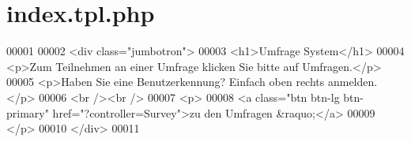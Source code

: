 \hypertarget{index_8tpl_8php}{\section{index.\-tpl.\-php}
\label{index_8tpl_8php}
}

\begin{DoxyCode}
00001 
00002       <div \textcolor{keyword}{class}=\textcolor{stringliteral}{"jumbotron"}>
00003         <h1>Umfrage System</h1>
00004         <p>Zum Teilnehmen an einer Umfrage klicken Sie bitte auf Umfragen.</p>
00005         <p>Haben Sie eine Benutzerkennung? Einfach oben rechts anmelden.</p>
00006         <br /><br />
00007         <p>
00008           <a \textcolor{keyword}{class}=\textcolor{stringliteral}{"btn btn-lg btn-primary"} href=\textcolor{stringliteral}{"?controller=Survey"}>zu den Umfragen &raquo;</a>
00009         </p>
00010       </div>
00011 
\end{DoxyCode}
